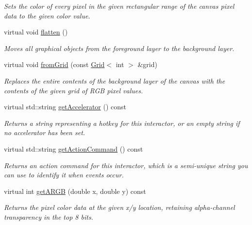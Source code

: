 \begin{DoxyCompactItemize}
\begin{DoxyCompactList}\small\item\em Sets the color of every pixel in the given rectangular range of the canvas pixel data to the given color value. \end{DoxyCompactList}\item 
virtual void \mbox{\hyperlink{classGCanvas_a4c4590df33ce47ad8a42e06f9f44fc93}{flatten}} ()
\begin{DoxyCompactList}\small\item\em Moves all graphical objects from the foreground layer to the background layer. \end{DoxyCompactList}\item 
virtual void \mbox{\hyperlink{classGCanvas_a46b18491b5230c765fbd9b8c7a095587}{from\+Grid}} (const \mbox{\hyperlink{classGrid}{Grid}}$<$ int $>$ \&grid)
\begin{DoxyCompactList}\small\item\em Replaces the entire contents of the background layer of the canvas with the contents of the given grid of R\+GB pixel values. \end{DoxyCompactList}\item 
virtual std\+::string \mbox{\hyperlink{classGInteractor_a69f8d23ed8f207fbecad99960776e942}{get\+Accelerator}} () const
\begin{DoxyCompactList}\small\item\em Returns a string representing a hotkey for this interactor, or an empty string if no accelerator has been set. \end{DoxyCompactList}\item 
virtual std\+::string \mbox{\hyperlink{classGInteractor_a94eb4276000c4fdfb508ce9e6317a82a}{get\+Action\+Command}} () const
\begin{DoxyCompactList}\small\item\em Returns an action command for this interactor, which is a semi-\/unique string you can use to identify it when events occur. \end{DoxyCompactList}\item 
virtual int \mbox{\hyperlink{classGDrawingSurface_ae394d39f20476570e083918d991c25bd}{get\+A\+R\+GB}} (double x, double y) const
\begin{DoxyCompactList}\small\item\em Returns the pixel color data at the given x/y location, retaining alpha-\/channel transparency in the top 8 bits. \end{DoxyCompactList}\item 

\end{DoxyCompactItemize}
